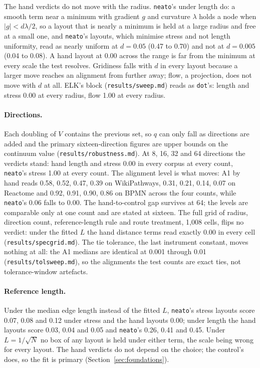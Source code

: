 \documentclass[a4paper,UKenglish]{gd-lipics-v3}
\begin{document}
The hand verdicts do not move with the radius. \texttt{neato}'s under length do: a smooth
term near a minimum with gradient $g$ and curvature $\lambda$ holds a node when
$|g| < d\lambda/2$, so a layout that is nearly a minimum is held at a large radius and
free at a small one, and \texttt{neato}'s layouts, which minimise stress and not length
uniformity, read as nearly uniform at $d = 0.05$ (0.47 to 0.70) and not at $d = 0.005$
(0.04 to 0.08). A hand layout at 0.00 across the range is far from the minimum at every
scale the test resolves. Gridiness falls with $d$ in every layout because a larger move
reaches an alignment from further away; flow, a projection, does not move with $d$ at all.
ELK's block (\texttt{results/sweep.md}) reads as \texttt{dot}'s: length and stress 0.00 at
every radius, flow 1.00 at every radius.

\paragraph{Directions.} Each doubling of $V$ contains the previous set, so $q$ can only
fall as directions are added and the primary sixteen-direction figures are upper bounds on
the continuum value (\texttt{results/robustness.md}). At 8, 16, 32 and 64 directions the
verdicts stand: hand length and stress 0.00 in every corpus at every count,
\texttt{neato}'s stress 1.00 at every count. The alignment level is what moves: A1 by hand
reads 0.58, 0.52, 0.47, 0.39 on WikiPathways, 0.31, 0.21, 0.14, 0.07 on Reactome and 0.92,
0.91, 0.90, 0.86 on BPMN across the four counts, while \texttt{neato}'s 0.06 falls to
0.00. The hand-to-control gap survives at 64; the levels are comparable only at one count
and are stated at sixteen. The full grid of radius, direction count, reference-length
rule and route treatment, 1{,}008 cells, flips no verdict: under the fitted $L$ the hand
distance terms read exactly 0.00 in every cell (\texttt{results/specgrid.md}). The tie
tolerance, the last instrument constant, moves nothing at all: the A1 medians are
identical at 0.001 through 0.01 (\texttt{results/tolsweep.md}), so the alignments the
test counts are exact ties, not tolerance-window artefacts.

\paragraph{Reference length.} Under the median edge length instead of the fitted $L$,
\texttt{neato}'s stress layouts score 0.07, 0.08 and 0.12 under stress and the hand
layouts 0.00; under length the hand layouts score 0.03, 0.04 and 0.05 and \texttt{neato}'s
0.26, 0.41 and 0.45. Under $L = 1/\sqrt{N}$ no box of any layout is held under either term,
the scale being wrong for every layout. The hand verdicts do not depend on the choice; the
control's does, so the fit is primary (Section~\ref{sec:foundations}).
\end{document}
